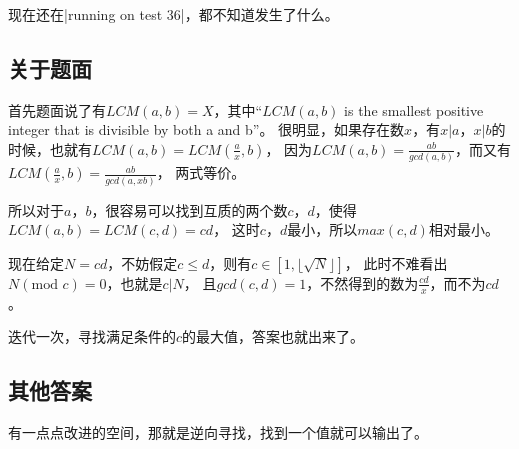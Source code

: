 现在还在\vb|running on test 36|，都不知道发生了什么。

\subsection{关于题面}
首先题面说了有$LCM(a,b)=X$，其中``$LCM(a,b)$ is the smallest positive integer
that is divisible by both a and b''。
很明显，如果存在数$x$，有$x|a$，$x|b$的时候，也就有$LCM(a,b)=LCM(\frac{a}{x},b)$，
因为$LCM(a,b)=\frac{ab}{gcd(a,b)}$，而又有$LCM(\frac{a}{x},b)=\frac{ab}{gcd(a,xb)}$，
两式等价。

所以对于$a$，$b$，很容易可以找到互质的两个数$c$，$d$，使得$LCM(a,b)=LCM(c,d)=cd$，
这时$c$，$d$最小，所以$max(c,d)$相对最小。

现在给定$N=cd$，不妨假定$c\le d$，则有$c\in [1,\lfloor\sqrt{N}\rfloor]$，
此时不难看出$N(\text{mod }c)=0$，也就是$c|N$，
且$gcd(c,d)=1$，不然得到的数为$\frac{cd}{x}$，而不为$cd$。

迭代一次，寻找满足条件的$c$的最大值，答案也就出来了。

\subsection{其他答案}
有一点点改进的空间，那就是逆向寻找，找到一个值就可以输出了。

